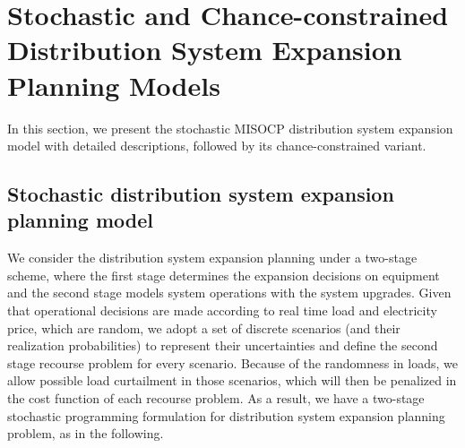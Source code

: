 \documentclass[journal]{IEEEtran}
\theoremstyle{remark}
\begin{document}
\section{Stochastic and Chance-constrained Distribution System Expansion Planning Models}
In this section, we present the stochastic MISOCP distribution system expansion model with detailed descriptions, followed by its chance-constrained variant.

\subsection{Stochastic distribution system expansion planning model}
\label{sect_SP_full}
We consider the distribution system expansion planning under a two-stage scheme, where the first stage determines the expansion decisions on equipment and the second stage models system operations with the system upgrades. Given that operational decisions are made according to real time load and electricity price, which are random, we adopt a set of discrete scenarios (and their realization probabilities) to represent their uncertainties and define the second stage  recourse problem for every scenario. Because of the randomness in loads, we allow possible load curtailment in those scenarios,  which will then be penalized in the cost function of each recourse problem. As a result, we have a two-stage stochastic programming formulation for distribution system expansion planning problem, as in the following.
\end{document}
